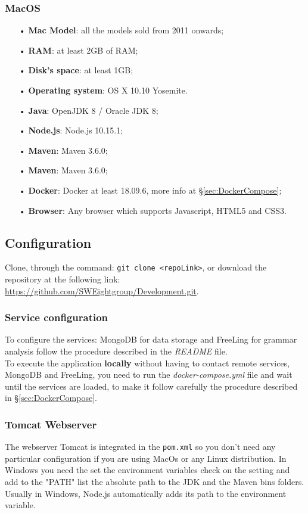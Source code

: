 \subsubsection{MacOS}
\begin{itemize}
\item [•]\textbf{Mac Model}: all the models sold from 2011 onwards;
\item [•]\textbf{RAM}: at least 2GB of RAM;
\item [•]\textbf{Disk’s space}: at least 1GB;
\item [•]\textbf{Operating system}: OS X 10.10 Yosemite.
\item [•]\textbf{Java}: OpenJDK 8 / Oracle JDK 8;
\item [•]\textbf{Node.js}: Node.js 10.15.1;
\item [•]\textbf{Maven}: Maven 3.6.0;
\item [•]\textbf{Maven}: Maven 3.6.0;
\item [•]\textbf{Docker}: Docker at least 18.09.6, more info at §\ref{sec:DockerCompose};  
\item [•]\textbf{Browser}: Any browser which supports Javascript, HTML5 and CSS3.
\end{itemize}

\subsection{Configuration}
\label{sec:Configuration}
Clone, through the command: \texttt{git clone <repoLink>}, or download the repository at the following link: \url{https://github.com/SWEightgroup/Development.git}.
\subsubsection{Service configuration}
To configure the services: MongoDB for data storage and FreeLing for grammar analysis follow the procedure described in the \textit{README} file.\\
To execute the application \textbf{locally} without having to contact remote services, MongoDB and FreeLing, you need to run the \textit{docker-compose.yml} file and wait until the services are loaded, to make it follow carefully the procedure described in §\ref{sec:DockerCompose}.
\subsubsection{Tomcat Webserver}
The webserver Tomcat is integrated in the \texttt{pom.xml} so you don't need any particular configuration if you are using MacOs or any Linux distribution.
In Windows you need the set the environment variables check on the setting and add to the "PATH" list the absolute path to the JDK and the Maven bins folders.
Usually in Windows, Node.js automatically adds its path to the environment variable.
	

